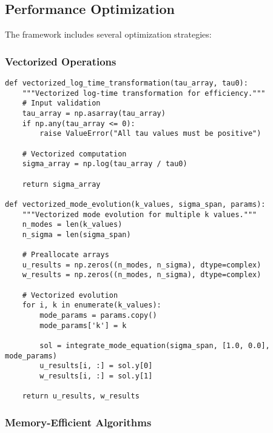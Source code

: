 \subsection{Performance Optimization}
\label{app:performance_optimization}

The framework includes several optimization strategies:

\subsubsection{Vectorized Operations}

\begin{verbatim}
def vectorized_log_time_transformation(tau_array, tau0):
    """Vectorized log-time transformation for efficiency."""
    # Input validation
    tau_array = np.asarray(tau_array)
    if np.any(tau_array <= 0):
        raise ValueError("All tau values must be positive")
    
    # Vectorized computation
    sigma_array = np.log(tau_array / tau0)
    
    return sigma_array

def vectorized_mode_evolution(k_values, sigma_span, params):
    """Vectorized mode evolution for multiple k values."""
    n_modes = len(k_values)
    n_sigma = len(sigma_span)
    
    # Preallocate arrays
    u_results = np.zeros((n_modes, n_sigma), dtype=complex)
    w_results = np.zeros((n_modes, n_sigma), dtype=complex)
    
    # Vectorized evolution
    for i, k in enumerate(k_values):
        mode_params = params.copy()
        mode_params['k'] = k
        
        sol = integrate_mode_equation(sigma_span, [1.0, 0.0], mode_params)
        u_results[i, :] = sol.y[0]
        w_results[i, :] = sol.y[1]
    
    return u_results, w_results
\end{verbatim}

\subsubsection{Memory-Efficient Algorithms}

